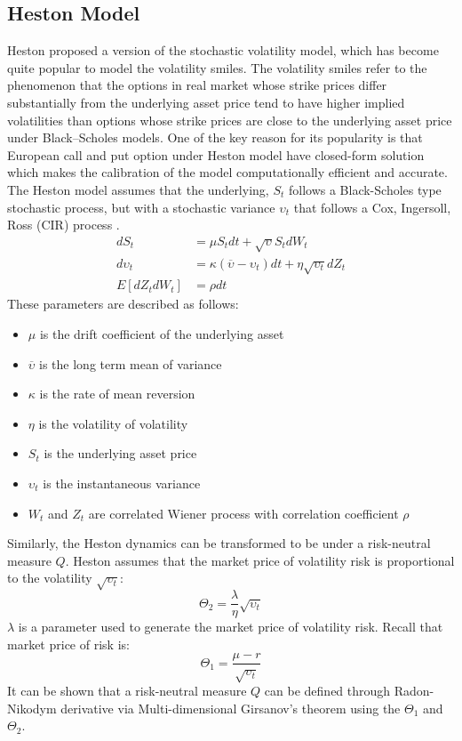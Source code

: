 \documentclass[letterpaper,12pt,titlepage,oneside,final]{book}
\numberwithin{equation}{section}
\theoremstyle{definition}
\begin{document}
\subsection{Heston Model}
\label{sec:heston}
Heston \cite{heston1993closed} proposed a version of the stochastic volatility model, which has become quite popular to model the volatility smiles.  The volatility smiles refer to the phenomenon that the options in real market whose strike prices differ substantially from the underlying asset price tend to have higher implied volatilities than options whose strike prices are close to the underlying asset price under Black–Scholes models. One of the key reason for its popularity is that European call and put option under Heston model have closed-form solution which makes the calibration of the model computationally efficient and accurate.
The Heston model assumes that the underlying, $S_t$ follows a Black-Scholes type stochastic process, but with a stochastic variance $\upsilon_t$ that follows a Cox, Ingersoll, Ross (CIR) process \cite{cox2005theory}.
\[
\begin{split}
dS_t&=\mu S_t dt + \sqrt{\upsilon} S_t dW_t\\
d\upsilon_t&=\kappa(\overline{\upsilon}-\upsilon_t)dt+\eta \sqrt{\upsilon_t}dZ_t\\
E[dZ_tdW_t]&=\rho dt
\end{split}
\]
These parameters are described as follows:
\begin{itemize}
  \item $\mu$ is the drift coefficient of the underlying asset
  \item $\overline{\upsilon}$ is the long term mean of variance
  \item $\kappa$ is the rate of mean reversion
  \item $\eta$ is the volatility of volatility
  \item $S_t$ is the underlying asset price
  \item $\upsilon_t$ is the  instantaneous variance
  \item $W_t$ and $Z_t$ are correlated Wiener process with correlation coefficient $\rho$
\end{itemize}
Similarly, the Heston dynamics can be transformed to be under a risk-neutral measure $Q$.
Heston \cite{heston1993closed} assumes that the market price of volatility risk is  proportional to the volatility $\sqrt{\upsilon_t}$:
\begin{equation}
\Theta_{2}=\frac{\lambda}{\eta} \sqrt{\upsilon_t}
\label{eq:price-vol-risk}
\end{equation}
$\lambda$ is a parameter used to generate the market price of volatility risk.
Recall that market price of risk is:
\[
\Theta_1=\frac{\mu-r}{\sqrt{\upsilon_t}}
\]
It can be shown that a risk-neutral measure $Q$ can be defined through Radon-Nikodym derivative via Multi-dimensional Girsanov's theorem \cite{shreve2004stochastic} using the $\Theta_1$ and $\Theta_2$.
\end{document}
